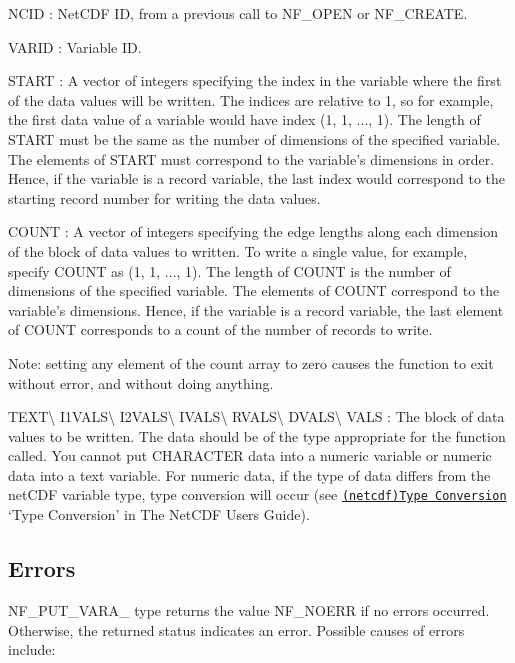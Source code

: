 {\ttfamily N\+C\+ID} \+: Net\+C\+DF ID, from a previous call to N\+F\+\_\+\+O\+P\+EN or N\+F\+\_\+\+C\+R\+E\+A\+TE.

{\ttfamily V\+A\+R\+ID} \+: Variable ID.

{\ttfamily S\+T\+A\+RT} \+: A vector of integers specifying the index in the variable where the first of the data values will be written. The indices are relative to 1, so for example, the first data value of a variable would have index (1, 1, ..., 1). The length of S\+T\+A\+RT must be the same as the number of dimensions of the specified variable. The elements of S\+T\+A\+RT must correspond to the variable’s dimensions in order. Hence, if the variable is a record variable, the last index would correspond to the starting record number for writing the data values.

{\ttfamily C\+O\+U\+NT} \+: A vector of integers specifying the edge lengths along each dimension of the block of data values to written. To write a single value, for example, specify C\+O\+U\+NT as (1, 1, ..., 1). The length of C\+O\+U\+NT is the number of dimensions of the specified variable. The elements of C\+O\+U\+NT correspond to the variable’s dimensions. Hence, if the variable is a record variable, the last element of C\+O\+U\+NT corresponds to a count of the number of records to write.

Note\+: setting any element of the count array to zero causes the function to exit without error, and without doing anything.

{\ttfamily T\+E\+XT}\textbackslash{} {\ttfamily I1\+V\+A\+LS}\textbackslash{} {\ttfamily I2\+V\+A\+LS}\textbackslash{} {\ttfamily I\+V\+A\+LS}\textbackslash{} {\ttfamily R\+V\+A\+LS}\textbackslash{} {\ttfamily D\+V\+A\+LS}\textbackslash{} {\ttfamily V\+A\+LS} \+: The block of data values to be written. The data should be of the type appropriate for the function called. You cannot put C\+H\+A\+R\+A\+C\+T\+ER data into a numeric variable or numeric data into a text variable. For numeric data, if the type of data differs from the net\+C\+DF variable type, type conversion will occur (see \href{netcdf.html#Type-Conversion}{\tt (netcdf)Type Conversion} ‘\+Type Conversion’ in The Net\+C\+DF Users Guide).

\subsection*{Errors }

N\+F\+\_\+\+P\+U\+T\+\_\+\+V\+A\+R\+A\+\_\+ type returns the value N\+F\+\_\+\+N\+O\+E\+RR if no errors occurred. Otherwise, the returned status indicates an error. Possible causes of errors include\+:


